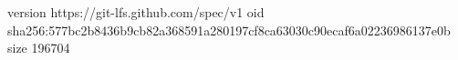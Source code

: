 version https://git-lfs.github.com/spec/v1
oid sha256:577bc2b8436b9cb82a368591a280197cf8ca63030c90ecaf6a02236986137e0b
size 196704
